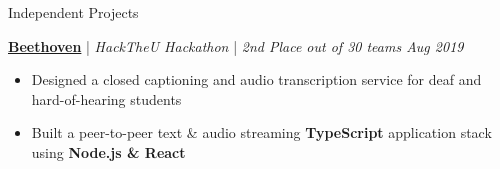 \documentclass{resume/resume}
\begin{document}
\begin{rSection}{Independent Projects}
  
  \href{https://devpost.com/software/beethoven-t9ud86}{\bf Beethoven} | {\em HackTheU Hackathon } | {\em 2nd Place out of 30 teams
  \hfill Aug 2019}
  \vspace{-6pt}
  \begin{itemize}[nosep]
    \item Designed a closed captioning and audio transcription service for deaf and hard-of-hearing students
    \item Built a peer-to-peer text \& audio streaming {\bf TypeScript} application stack using {\bf Node.js \& React}
  \end{itemize}

  
  

\end{rSection}
\end{document}
